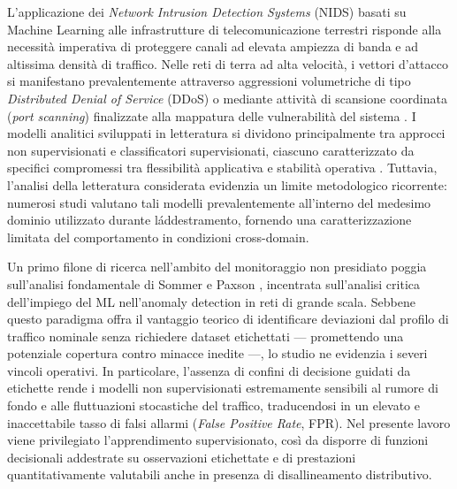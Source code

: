 L'applicazione dei \textit{Network Intrusion Detection Systems} (NIDS) basati su Machine Learning alle infrastrutture di telecomunicazione terrestri risponde alla necessità imperativa di proteggere canali ad elevata ampiezza di banda e ad altissima densità di traffico.
Nelle reti di terra ad alta velocità, i vettori d'attacco si manifestano prevalentemente attraverso aggressioni volumetriche di tipo \textit{Distributed Denial of Service} (DDoS) o mediante attività di scansione coordinata (\textit{port scanning}) finalizzate alla mappatura delle vulnerabilità del sistema \cite{hindy2020, khraisat2019}.
I modelli analitici sviluppati in letteratura si dividono principalmente tra approcci non supervisionati e classificatori supervisionati, ciascuno caratterizzato da specifici compromessi tra flessibilità applicativa e stabilità operativa \cite{kilincer2021}.
Tuttavia, l'analisi della letteratura considerata evidenzia un limite metodologico ricorrente: numerosi studi valutano tali modelli prevalentemente all'interno del medesimo dominio utilizzato durante l\'addestramento, fornendo una caratterizzazione limitata del comportamento in condizioni cross-domain.

Un primo filone di ricerca nell'ambito del monitoraggio non presidiato poggia sull'analisi fondamentale di Sommer e Paxson \cite{sommer2010}, incentrata sull'analisi critica dell'impiego del ML nell'anomaly detection in reti di grande scala. 
Sebbene questo paradigma offra il vantaggio teorico di identificare deviazioni dal profilo di traffico nominale senza richiedere dataset etichettati — promettendo una potenziale copertura contro minacce inedite —, lo studio ne evidenzia i severi vincoli operativi. 
In particolare, l'assenza di confini di decisione guidati da etichette rende i modelli non supervisionati estremamente sensibili al rumore di fondo e alle fluttuazioni stocastiche del traffico, traducendosi in un elevato e inaccettabile tasso di falsi allarmi (\textit{False Positive Rate}, FPR). 
Nel presente lavoro viene privilegiato l'apprendimento supervisionato, così da disporre di funzioni decisionali addestrate su osservazioni etichettate e di prestazioni quantitativamente valutabili anche in presenza di disallineamento distributivo.

